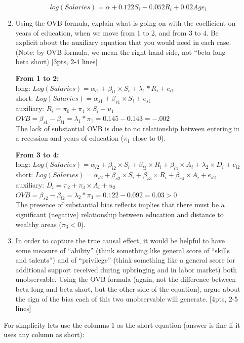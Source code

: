 \documentclass[answers]{exam}
\begin{document}
\begin{enumerate}
\begin{enumerate}[label=\alph*)]
    \begin{solution}
    $$log(Salaries) = \alpha + 0.122 S_{i} -0.052 R_{i} +0.02 Age_{i}$$
    \end{solution}
    
    \item Using the OVB formula, explain what is going on with the coefficient on years of education, when we move from 1 to 2, and from 3 to 4. Be explicit about the auxiliary equation that you would need in each case.  (Note: by OVB formula, we mean the right-hand side, not “beta long – beta short) [3pts, 2-4 lines]
     \begin{solution}
  \textbf{  From 1 to 2:}\\
long: $Log(Salaries) = \alpha_{l 1} + \beta_{l 1} \times S_{i} + \lambda_{1}* R_{i} + e_{l 1}$\\
short: $Log(Salaries) = \alpha_{s 1} + \beta_{s 1} \times S_{i} + e_{s 1}$\\
auxiliary: 
$R_{i} = \pi_{0} + \pi_{1} \times S_{i} +u_{1}$\\
$OVB= \beta_{s 1}-\beta_{l 1} = \lambda_{1} * \pi_{1} =0.145 - 0.143 = -.002$\\
The lack of substantial OVB is due to no relationship between entering in a recession and years of education ($\pi_{1}$ close to 0).  

   \textbf{ From 3 to 4:} \\
    long: $Log(Salaries) = \alpha_{l 2} + \beta_{l 2} \times S_{i} + \beta_{l 3}  \times R_{i} + \beta_{l 4}  \times A_{i} + \lambda_{2}  \times D_{i} + e_{l 2}$\\
short: $Log(Salaries) = \alpha_{s 2} + \beta_{s 2} \times S_{i} + \beta_{s 3}  \times R_{i} + \beta_{s 4}  \times A_{i} + e_{s 2}$\\
auxiliary: 
$D_{i} = \pi_{2} + \pi_{3} \times A_{i} +u_{2}$\\
$OVB= \beta_{s 2}-\beta_{l 2} = \lambda_{2} * \pi_{3} =0.122 - 0.092 = 0.03 > 0 $\\
The presence of substantial bias reflects implies that there must be a significant (negative) relationship between education and distance to wealthy areas ($\pi_{3}<0$). 
     \end{solution}
     
    \item In order to capture the true causal effect, it would be helpful to have some measure of “ability” (think something like general score of “skills and talents”) and of “privilege” (think something like a general score for additional support received during upbringing and in labor market) both unobservable. Using the OVB formula (again, not the difference between beta long and beta short, but the other side of the equation), argue about the sign of the bias each of this two unobservable will generate. [4pts, 2-5 lines]
\end{enumerate}
    For simplicity lets use the columns 1 as the short equation (answer is fine if it uses any column as short): 
    \begin{solution}
    

\end{solution}
\end{enumerate}
\end{document}
